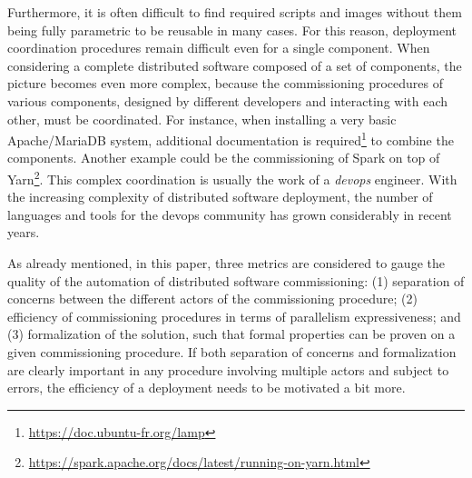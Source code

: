 Furthermore, it is often difficult to find required scripts and images without them being fully parametric to be reusable in many cases. For this reason, deployment coordination procedures remain difficult even for a single component.
%
When considering a complete distributed software composed of a set of
components, the picture becomes even more complex, because
the commissioning procedures of various components, designed by different developers and interacting with each other, must be coordinated.
For instance, when installing a very basic Apache/MariaDB system, additional documentation is
required\footnote{\url{https://doc.ubuntu-fr.org/lamp}} to combine the components. Another example could be the commissioning of Spark on top of Yarn\footnote{\url{https://spark.apache.org/docs/latest/running-on-yarn.html}}. %
%
This complex coordination is usually the work of a \emph{devops} engineer. With the increasing complexity of distributed software deployment, the number of languages and tools for the devops community has grown considerably in recent years.

As already mentioned, in this paper, three metrics are considered to gauge the quality of the automation of distributed software commissioning: (1) separation of concerns between the different actors of the commissioning procedure; (2) efficiency of commissioning procedures in terms of parallelism expressiveness; and (3) formalization of the solution, such that formal properties can be proven on a given commissioning procedure.
If both separation of concerns and formalization are clearly important in any procedure involving multiple actors and subject to errors, the efficiency of a deployment needs to be motivated a bit more.

